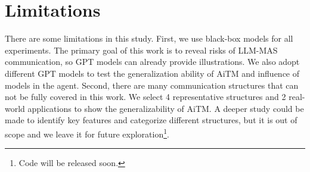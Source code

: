 \section*{Limitations}

There are some limitations in this study. First, we use black-box models for all experiments. The primary goal of this work is to reveal risks of LLM-MAS communication, so GPT models can already provide illustrations. We also adopt different GPT models to test the generalization ability of AiTM and influence of models in the agent. Second, there are many communication structures that can not be fully covered in this work. We select 4 representative structures and 2 real-world applications to show the generalizability of AiTM. A deeper study could be made to identify key features and categorize different structures, but it is out of scope and we leave it for future exploration\footnote{Code will be released soon.}.
